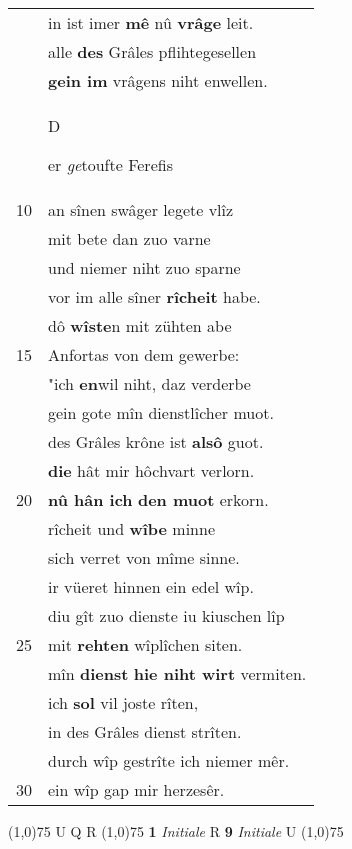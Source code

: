 \documentclass[8pt,a4paper,notitlepage]{article}
\begin{document}
\begin{table}[ht]
\begin{minipage}[t]{0.5\linewidth}
\begin{tabular}{rl}
 & in ist imer \textbf{mê} nû \textbf{vrâge} leit.\\ 
 & alle \textbf{des} Grâles pflihtegesellen\\ 
 & \textbf{gein im} vrâgens niht enwellen.\\ 
 & \begin{large}D\end{large}er \textit{ge}toufte Ferefis\\ 
10 & an sînen swâger legete vlîz\\ 
 & mit bete dan zuo varne\\ 
 & und niemer niht zuo sparne\\ 
 & vor im alle sîner \textbf{rîcheit} habe.\\ 
 & dô \textbf{wîste}n mit zühten abe\\ 
15 & Anfortas von dem gewerbe:\\ 
 & "ich \textbf{en}wil niht, daz verderbe\\ 
 & gein gote mîn dienstlîcher muot.\\ 
 & des Grâles krône ist \textbf{alsô} guot.\\ 
 & \textbf{die} hât mir hôchvart verlorn.\\ 
20 & \textbf{nû hân ich} \textbf{den muot} erkorn.\\ 
 & rîcheit und \textbf{wîbe} minne\\ 
 & sich verret von mîme sinne.\\ 
 & ir vüeret hinnen ein edel wîp.\\ 
 & diu gît zuo dienste iu kiuschen lîp\\ 
25 & mit \textbf{rehten} wîplîchen siten.\\ 
 & mîn \textbf{dienst} \textbf{hie niht wirt} vermiten.\\ 
 & ich \textbf{sol} vil joste rîten,\\ 
 & in des Grâles dienst strîten.\\ 
 & durch wîp gestrîte ich niemer mêr.\\ 
30 & ein wîp gap mir herzesêr.\\ 
\end{tabular}
\scriptsize
\line(1,0){75} \newline
U Q R \newline
\line(1,0){75} \newline
\textbf{1} \textit{Initiale} R  \textbf{9} \textit{Initiale} U  \newline
\line(1,0){75} \newline

\end{minipage}
\end{table}
\end{document}
